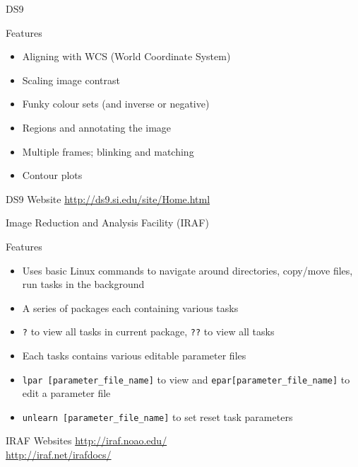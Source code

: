 \documentclass{beamer}
\begin{document}
\begin{frame}{DS9}
  \begin{block}{Features}
   \begin{itemize}
    \item{Aligning with WCS (World Coordinate System)}
    \item{Scaling image contrast}
    \item{Funky colour sets (and inverse or negative)}
    \item{Regions and annotating the image}
    \item{Multiple frames; blinking and matching}    
    \item{Contour plots}
  \end{itemize}
  \end{block}
  \begin{block}{DS9 Website}
    \url{http://ds9.si.edu/site/Home.html}
  \end{block}
\end{frame}

\begin{frame}{Image Reduction and Analysis Facility (IRAF)}
  \begin{block}{Features}
   \begin{itemize}
    \item{Uses basic Linux commands to navigate around directories, copy/move files, run tasks in the background}
    \item{A series of packages each containing various tasks}
    \item{\texttt{?} to view all tasks in current package, \texttt{??} to view all tasks}
    \item{Each tasks contains various editable parameter files}
    \item{\texttt{lpar [parameter\_file\_name]} to view and \texttt{epar[parameter\_file\_name]} to edit a  parameter file}    
    \item{\texttt{unlearn [parameter\_file\_name]} to set reset task parameters}
   \end{itemize}
  \end{block}
  \begin{block}{IRAF Websites}
    \url{http://iraf.noao.edu/}\\
    \url{http://iraf.net/irafdocs/}
  \end{block}
\end{frame}
\end{document}
